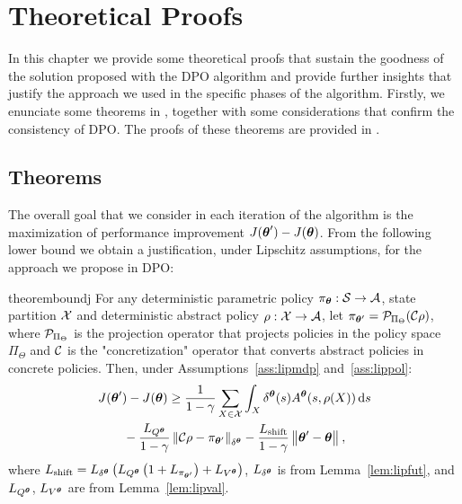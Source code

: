 \chapter{Theoretical Proofs} \label{chap:proofs}
In this chapter we provide some theoretical proofs that sustain the goodness of the solution proposed with the \ac{DPO} algorithm and provide further insights that justify the approach we used in the specific phases of the algorithm. Firstly, we enunciate some theorems in , together with some considerations that confirm the consistency of \ac{DPO}. The proofs of these theorems are provided in .

\section{Theorems} \label{sec:theo}
The overall goal that we consider in each iteration of the algorithm is the maximization of performance improvement $J(\vtheta') - J(\vtheta)$.
From the following lower bound we obtain a justification, under Lipschitz assumptions, for the approach we propose in \ac{DPO}:
%
\begin{restatable}{theorem}{boundj}\label{lem:boundj}
	For any deterministic parametric policy ${\pi_{\vtheta}:\Sspace\to\Aspace}$, state partition $\Xspace$ and deterministic abstract policy ${\rho:\Xspace\to\Aspace}$, let $\pi_{\vtheta'} = \Proj_{\Pi_{\Theta}}(\Conc\rho)$, where $\Proj_{\Pi_{\Theta}}$ is the projection operator that projects policies in the policy space ${\Pi_{\Theta}}$ and $\Conc$ is the "concretization" operator that converts abstract policies in concrete policies. Then, under Assumptions~\ref{ass:lipmdp} and~\ref{ass:lippol}:
	\begin{align*}
	&J(\vtheta') - J(\vtheta) \geq \frac{1}{1-\gamma}\sum_{X\in\Xspace}\int_{X}\delta^{\vtheta}(s)A^{\vtheta}(s,\rho(X)) \de s 
	\nonumber\\&\qquad- \frac{L_{Q^{\vtheta}}}{1-\gamma}\norm[\delta^{\vtheta}]{\Conc\rho - \pi_{\vtheta'}} 
	-\frac{L_{\text{shift}}}{1-\gamma} \norm{\vtheta'-\vtheta},
	\end{align*}
	where $L_{\text{shift}}=L_{\delta^{\vtheta}}\left(L_{Q^{\vtheta}}\left(1+L_{\pi_{\vtheta'}}\right)+L_{V^{\vtheta}}\right)$, $L_{\delta^{\vtheta}}$ is from Lemma~\ref{lem:lipfut}, and $L_{Q^{\vtheta}}$, $L_{V^{\vtheta}}$ are from Lemma~\ref{lem:lipval}. 
\end{restatable}


